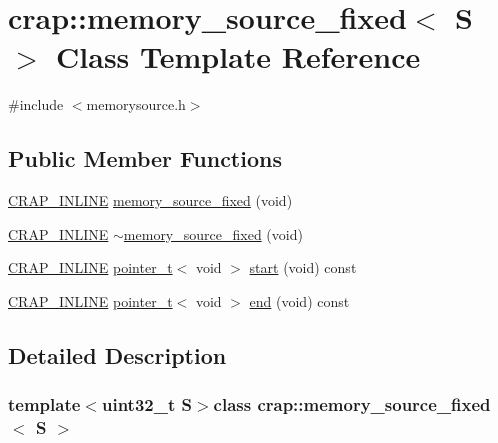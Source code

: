 \hypertarget{classcrap_1_1memory__source__fixed}{}\section{crap\+:\+:memory\+\_\+source\+\_\+fixed$<$ S $>$ Class Template Reference}
\label{classcrap_1_1memory__source__fixed}


{\ttfamily \#include $<$memorysource.\+h$>$}

\subsection*{Public Member Functions}
\begin{DoxyCompactItemize}
\item 
\hyperlink{config__x86_8h_a5a40526b8d842e7ff731509998bb0f1c}{C\+R\+A\+P\+\_\+\+I\+N\+L\+I\+N\+E} \hyperlink{classcrap_1_1memory__source__fixed_a40e946604622cdd7ffe49a756b87b841}{memory\+\_\+source\+\_\+fixed} (void)
\item 
\hyperlink{config__x86_8h_a5a40526b8d842e7ff731509998bb0f1c}{C\+R\+A\+P\+\_\+\+I\+N\+L\+I\+N\+E} \hyperlink{classcrap_1_1memory__source__fixed_a7493863d9c032cf76ffd809017b63a35}{$\sim$memory\+\_\+source\+\_\+fixed} (void)
\item 
\hyperlink{config__x86_8h_a5a40526b8d842e7ff731509998bb0f1c}{C\+R\+A\+P\+\_\+\+I\+N\+L\+I\+N\+E} \hyperlink{structcrap_1_1pointer__t}{pointer\+\_\+t}$<$ void $>$ \hyperlink{classcrap_1_1memory__source__fixed_a146e5e17f9ed2d17c9f8c0d972e989d4}{start} (void) const 
\item 
\hyperlink{config__x86_8h_a5a40526b8d842e7ff731509998bb0f1c}{C\+R\+A\+P\+\_\+\+I\+N\+L\+I\+N\+E} \hyperlink{structcrap_1_1pointer__t}{pointer\+\_\+t}$<$ void $>$ \hyperlink{classcrap_1_1memory__source__fixed_a60ce8ebc97fe7a92c2bb7c70ed094291}{end} (void) const 
\end{DoxyCompactItemize}


\subsection{Detailed Description}
\subsubsection*{template$<$uint32\+\_\+t S$>$class crap\+::memory\+\_\+source\+\_\+fixed$<$ S $>$}



